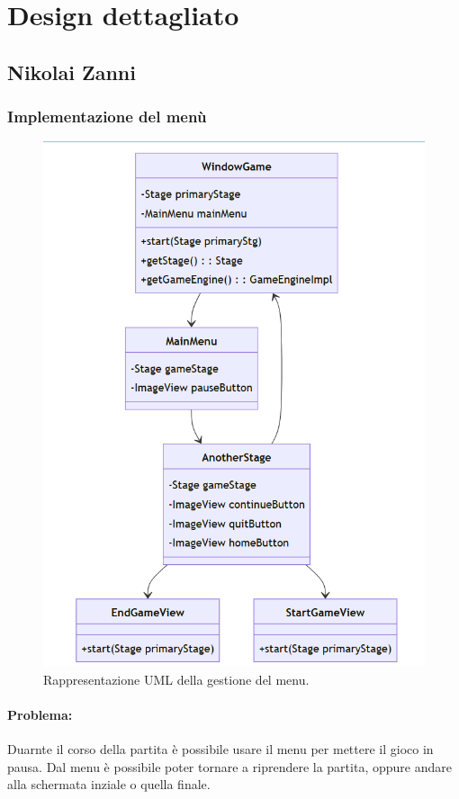 \documentclass[a4paper,12pt]{report}
\begin{document}
\section{Design dettagliato}
\subsection{Nikolai Zanni}

\subsubsection{Implementazione del menù}

\begin{figure}[H]
\centering{}
\includegraphics[width=\textwidth]{img/mainmenu.png}
\caption{Rappresentazione UML della gestione del menu.}
\end{figure}

\paragraph{Problema:}
Duarnte il corso della partita è possibile usare il menu per mettere il gioco in pausa. 
Dal menu è possibile poter tornare a riprendere la partita, oppure andare alla schermata inziale o quella finale.
\end{document}

